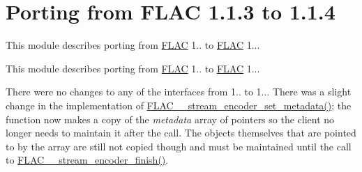 \hypertarget{group__porting__1__1__3__to__1__1__4}{}\section{Porting from F\+L\+AC 1.1.3 to 1.1.4}
\label{group__porting__1__1__3__to__1__1__4}


This module describes porting from \hyperlink{namespace_f_l_a_c}{F\+L\+AC} 1.. to \hyperlink{namespace_f_l_a_c}{F\+L\+AC} 1...  


This module describes porting from \hyperlink{namespace_f_l_a_c}{F\+L\+AC} 1.. to \hyperlink{namespace_f_l_a_c}{F\+L\+AC} 1... 

There were no changes to any of the interfaces from 1.. to 1... There was a slight change in the implementation of \hyperlink{group__flac__stream__encoder_ga67b30b1a67a9274f7708a22154b225f6}{F\+L\+A\+C\+\_\+\+\_\+stream\+\_\+encoder\+\_\+set\+\_\+metadata()}; the function now makes a copy of the {\itshape metadata} array of pointers so the client no longer needs to maintain it after the call. The objects themselves that are pointed to by the array are still not copied though and must be maintained until the call to \hyperlink{group__flac__stream__encoder_gab2c1e5477c1e3fe9ad0d722ff8eecda2}{F\+L\+A\+C\+\_\+\+\_\+stream\+\_\+encoder\+\_\+finish()}. 